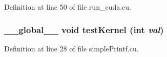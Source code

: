 Definition at line 50 of file run\_\-cuda.cu.\hypertarget{run__cuda_8cu_a6e9fe17e0d6f904d708c6f3e8a65c888}{
\subsubsection[{testKernel}]{\setlength{\rightskip}{0pt plus 5cm}\_\-\_\-global\_\-\_\- void testKernel (int {\em val})}}
\label{run__cuda_8cu_a6e9fe17e0d6f904d708c6f3e8a65c888}


Definition at line 28 of file simplePrintf.cu.